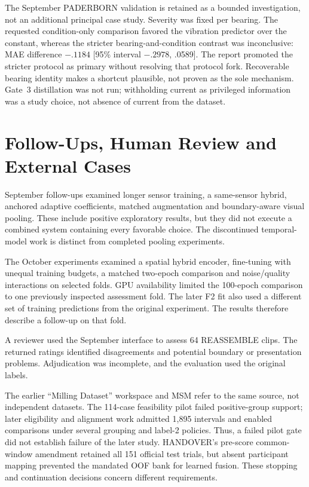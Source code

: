 The September PADERBORN validation is retained as a bounded investigation, not an
additional principal case study. Severity was fixed per bearing. The requested
condition-only comparison favored the vibration predictor over the constant, whereas the
stricter bearing-and-condition contrast was inconclusive: MAE difference $-.1184$ [95\%
interval $-.2978$, .0589]. The report promoted the stricter protocol as primary without
resolving that protocol fork. Recoverable bearing identity makes a shortcut plausible,
not proven as the sole mechanism. Gate~3 distillation was not run; withholding current
as privileged information was a study choice, not absence of current from the
dataset.

\section{Follow-Ups, Human Review and External Cases}
September follow-ups examined longer sensor training, a same-sensor hybrid, anchored
adaptive coefficients, matched augmentation and boundary-aware visual pooling. These
include positive exploratory results, but they did not execute a combined system
containing every favorable choice. The discontinued temporal-model work is distinct from
completed pooling experiments.

The October experiments examined a spatial hybrid encoder, fine-tuning with unequal
training budgets, a matched two-epoch comparison and noise/quality interactions on
selected folds. GPU availability limited the 100-epoch comparison to one previously
inspected assessment fold. The later F2 fit also used a different set of training
predictions from the original experiment. The results therefore describe a follow-up on
that fold.

A reviewer used the September interface to assess 64 REASSEMBLE clips. The returned
ratings identified disagreements and potential boundary or presentation problems.
Adjudication was incomplete, and the evaluation used the original labels.

The earlier \enquote{Milling Dataset} workspace and MSM refer to the same source, not
independent datasets. The 114-case feasibility pilot failed positive-group support;
later eligibility and alignment work admitted 1,895 intervals and enabled comparisons
under several grouping and label-2 policies. Thus, a failed pilot gate did not establish
failure of the later study. HANDOVER's pre-score common-window amendment retained all
151 official test trials, but absent participant mapping prevented the mandated OOF bank
for learned fusion. These stopping and continuation decisions concern different
requirements.

